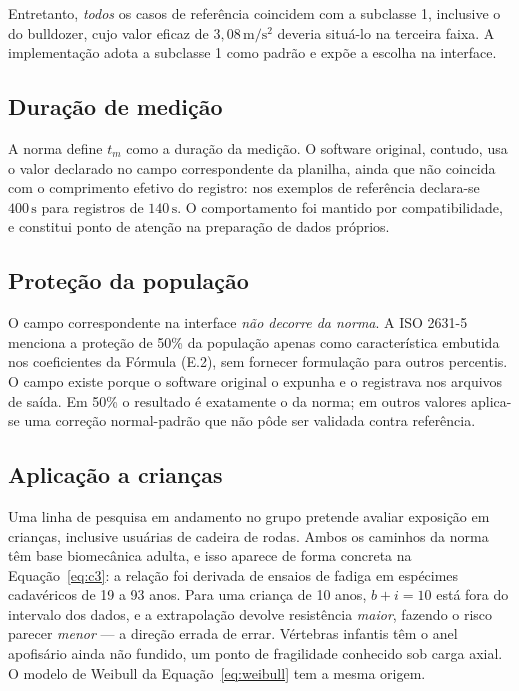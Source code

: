 \documentclass[11pt,a4paper]{article}
\newcommand{\unit}[2]{\ensuremath{#1\,\mathrm{#2}}}
\begin{document}
Entretanto, \emph{todos} os casos de referência coincidem com a subclasse 1,
inclusive o do bulldozer, cujo valor eficaz de \unit{3{,}08}{m/s^2} deveria
situá-lo na terceira faixa. A implementação adota a subclasse 1 como padrão e
expõe a escolha na interface.

\subsection{Duração de medição}

A norma define $t_m$ como a duração da medição. O software original, contudo,
usa o valor declarado no campo correspondente da planilha, ainda que não
coincida com o comprimento efetivo do registro: nos exemplos de referência
declara-se \unit{400}{s} para registros de \unit{140}{s}. O comportamento foi
mantido por compatibilidade, e constitui ponto de atenção na preparação de dados
próprios.

\subsection{Proteção da população}

O campo correspondente na interface \emph{não decorre da norma}. A ISO 2631-5
menciona a proteção de 50\% da população apenas como característica embutida nos
coeficientes da Fórmula (E.2), sem fornecer formulação para outros percentis. O
campo existe porque o software original o expunha e o registrava nos arquivos de
saída. Em 50\% o resultado é exatamente o da norma; em outros valores aplica-se
uma correção normal-padrão que não pôde ser validada contra referência.

\subsection{Aplicação a crianças}
\label{sec:criancas}

Uma linha de pesquisa em andamento no grupo pretende avaliar exposição em
crianças, inclusive usuárias de cadeira de rodas. Ambos os caminhos da norma têm
base biomecânica adulta, e isso aparece de forma concreta na
Equação~\eqref{eq:c3}: a relação foi derivada de ensaios de fadiga em espécimes
cadavéricos de 19 a 93 anos. Para uma criança de 10 anos, $b+i = 10$ está fora do
intervalo dos dados, e a extrapolação devolve resistência \emph{maior}, fazendo
o risco parecer \emph{menor} --- a direção errada de errar. Vértebras infantis
têm o anel apofisário ainda não fundido, um ponto de fragilidade conhecido sob
carga axial. O modelo de Weibull da Equação~\eqref{eq:weibull} tem a mesma
origem.
\end{document}
